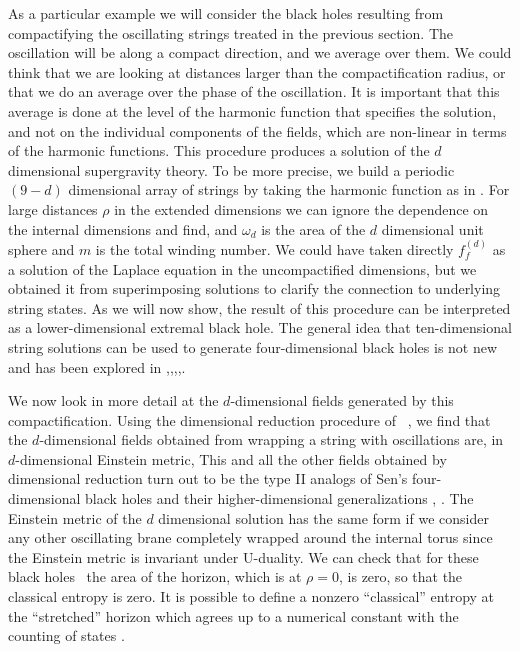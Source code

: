 As a particular example we will consider the black holes
resulting from compactifying the oscillating strings
treated in the previous section. 
The oscillation will be along a compact direction, and
 we average over them. We could think
that we are looking at distances larger than
the compactification radius, or that we do an average over
the phase of the oscillation. It is important that this 
average is done at the level of the harmonic function
that specifies the solution, and not on the individual
components of the fields, which are non-linear in terms
of the harmonic functions. This procedure  
produces  a  solution of the $d$ dimensional supergravity
theory. 
To be more
precise, we build a periodic $(9-d)$ dimensional array of strings by
taking the harmonic function as in \lattice .
For large distances $\rho$ in the extended dimensions 
we can ignore the dependence on the internal
dimensions and find, 
\eqn{}
and $\omega_d$ is the area of the $d$ dimensional unit sphere and
$m$ is the total winding number. We
could have taken directly $f_f^{(d)}$ as a solution of
the Laplace equation in the uncompactified dimensions, but we 
obtained it from superimposing solutions to clarify the
 connection to underlying string states. As we
will now show, the result of this procedure can be interpreted as a
lower-dimensional extremal black hole. The general idea that
ten-dimensional string solutions can be used to generate
four-dimensional black holes is not new and has been explored in
\hortseprl ,\ber ,\kallosh ,\mirjam ,\cmp .


We now look in more detail at the $d$-dimensional fields generated by
this compactification. Using the dimensional reduction procedure of
\sm\ , we find that the
$d$-dimensional fields obtained from wrapping a string with oscillations
are, in $d$-dimensional Einstein metric,  
\eqn{}
This and all the other fields obtained by dimensional reduction turn
out to be the type II analogs   of Sen's four-dimensional black holes and
their higher-dimensional generalizations 
\senbh , \peet .
The Einstein metric of the $d$ dimensional solution has the same
form if we consider  any  other oscillating brane completely 
wrapped around  the internal torus since the Einstein metric  is
 invariant under U-duality. 
We can check that for these black  holes \ddimdil\ the 
area of the horizon, which is at $\rho =0 $,  is zero, so that
the classical entropy  is zero. It is possible to define
a nonzero ``classical'' entropy at the ``stretched'' horizon
which agrees up to a numerical constant with the counting
of states \senbhstr .

